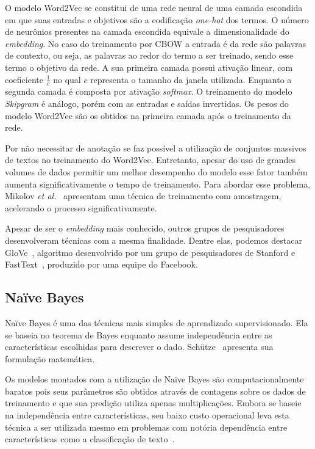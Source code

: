 O modelo Word2Vec se constitui de uma rede neural de uma camada escondida em que suas entradas e objetivos são a
codificação \textit{one-hot} dos termos.
O número de neurônios presentes na camada escondida equivale a dimensionalidade do \textit{embedding}.
No caso do treinamento por CBOW a entrada é da rede são palavras de contexto, ou seja, as palavras ao redor do termo a
ser treinado, sendo esse termo o objetivo da rede.
A sua primeira camada possui ativação linear, com coeficiente $\frac{1}{c}$ no qual $c$ representa o tamanho da janela
utilizada.
Enquanto a segunda camada é composta por ativação \textit{softmax}.
O treinamento do modelo \textit{Skipgram} é análogo, porém com as entradas e saídas invertidas.
Os pesos do modelo Word2Vec são os obtidos na primeira camada após o treinamento da rede.

Por não necessitar de anotação se faz possível a utilização de conjuntos massivos de textos no treinamento do Word2Vec.
Entretanto, apesar do uso de grandes volumes de dados permitir um melhor desempenho do modelo esse fator também aumenta
significativamente o tempo de treinamento.
Para abordar esse problema, Mikolov \textit{et al.}~\cite{mikolov13b} apresentam uma técnica de treinamento com
amostragem, acelerando o processo significativamente.

Apesar de ser o \textit{embedding} mais conhecido, outros grupos de pesquisadores desenvolveram técnicas com a mesma
finalidade.
Dentre elas, podemos destacar GloVe~\cite{pennington14}, algoritmo desenvolvido por um grupo de pesquisadores de Stanford
e FastText~\cite{bojanowski16}, produzido por uma equipe do Facebook.

\subsection{Naïve Bayes}

Naïve Bayes é uma das técnicas mais simples de aprendizado supervisionado.
Ela se baseia no teorema de Bayes enquanto assume independência entre as características escolhidas para descrever o dado.
Schütze~\cite{schutze08} apresenta sua formulação matemática.

Os modelos montados com a utilização de Naïve Bayes são computacionalmente baratos pois seus parâmetros são obtidos
através de contagens sobre os dados de treinamento e que sua predição utiliza apenas multiplicações.
Embora se baseie na independência entre características, seu baixo custo operacional leva esta técnica a ser utilizada
mesmo em problemas com notória dependência entre características como a classificação de texto~\cite{mccallum98}.

